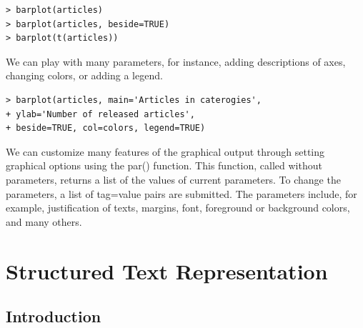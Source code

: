 \documentclass[11pt,openany,executivepaper]{book}
\begin{document}
\begin{verbatim}
> barplot(articles)
> barplot(articles, beside=TRUE)
> barplot(t(articles))
\end{verbatim}

We can play with many parameters, for instance, adding descriptions of axes, changing colors, or adding a legend.

\begin{verbatim}
> barplot(articles, main='Articles in caterogies',
+ ylab='Number of released articles',
+ beside=TRUE, col=colors, legend=TRUE)
\end{verbatim}

We can customize many features of the graphical output through setting graphical options using the par() function. This function, called without parameters, returns a list of the values of current parameters. To change the parameters, a list of tag=value pairs are submitted. The parameters include, for example, justification of texts, margins, font, foreground or background colors, and many others.

\chapter{Structured Text Representation}\thispagestyle{empty}
\section{Introduction}
\end{document}
